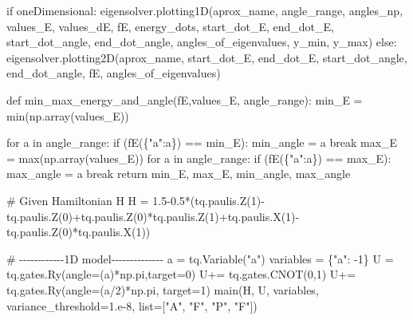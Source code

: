 \documentclass[
  letterpaper,
  DIV=11,
  numbers=noendperiod]{scrartcl}
\newenvironment{Shaded}{\begin{snugshade}}{\end{snugshade}}
\newcommand{\BuiltInTok}[1]{\textcolor[rgb]{0.00,0.23,0.31}{#1}}
\newcommand{\CommentTok}[1]{\textcolor[rgb]{0.37,0.37,0.37}{#1}}
\newcommand{\ControlFlowTok}[1]{\textcolor[rgb]{0.00,0.23,0.31}{#1}}
\newcommand{\DecValTok}[1]{\textcolor[rgb]{0.68,0.00,0.00}{#1}}
\newcommand{\FloatTok}[1]{\textcolor[rgb]{0.68,0.00,0.00}{#1}}
\newcommand{\KeywordTok}[1]{\textcolor[rgb]{0.00,0.23,0.31}{#1}}
\newcommand{\NormalTok}[1]{\textcolor[rgb]{0.00,0.23,0.31}{#1}}
\newcommand{\OperatorTok}[1]{\textcolor[rgb]{0.37,0.37,0.37}{#1}}
\newcommand{\StringTok}[1]{\textcolor[rgb]{0.13,0.47,0.30}{#1}}
\begin{document}
\begin{Shaded}
\begin{Highlighting}[]
        \ControlFlowTok{if}\NormalTok{ oneDimensional:}
\NormalTok{            eigensolver.plotting1D(aprox\_name, angle\_range, angles\_np, values\_E, values\_dE, fE, energy\_dots, start\_dot\_E, end\_dot\_E, start\_dot\_angle, end\_dot\_angle, angles\_of\_eigenvalues, y\_min, y\_max)}
        \ControlFlowTok{else}\NormalTok{:}
\NormalTok{            eigensolver.plotting2D(aprox\_name, start\_dot\_E, end\_dot\_E, start\_dot\_angle, end\_dot\_angle, fE, angles\_of\_eigenvalues)}
    

    \KeywordTok{def}\NormalTok{ min\_max\_energy\_and\_angle(fE,values\_E, angle\_range):}
\NormalTok{        min\_E }\OperatorTok{=} \BuiltInTok{min}\NormalTok{(np.array(values\_E))}

        \ControlFlowTok{for}\NormalTok{ a }\KeywordTok{in}\NormalTok{ angle\_range:}
            \ControlFlowTok{if}\NormalTok{ (fE(\{}\StringTok{"a"}\NormalTok{:a\}) }\OperatorTok{==}\NormalTok{ min\_E):}
\NormalTok{                min\_angle }\OperatorTok{=}\NormalTok{ a}
                \ControlFlowTok{break}
\NormalTok{        max\_E }\OperatorTok{=} \BuiltInTok{max}\NormalTok{(np.array(values\_E))}
        \ControlFlowTok{for}\NormalTok{ a }\KeywordTok{in}\NormalTok{ angle\_range:}
            \ControlFlowTok{if}\NormalTok{ (fE(\{}\StringTok{"a"}\NormalTok{:a\}) }\OperatorTok{==}\NormalTok{ max\_E):}
\NormalTok{                max\_angle }\OperatorTok{=}\NormalTok{ a}
                \ControlFlowTok{break}
        \ControlFlowTok{return}\NormalTok{ min\_E, max\_E, min\_angle, max\_angle}
    
\CommentTok{\# Given Hamiltonian H}
\NormalTok{H }\OperatorTok{=} \FloatTok{1.5}\OperatorTok{{-}}\FloatTok{0.5}\OperatorTok{*}\NormalTok{(tq.paulis.Z(}\DecValTok{1}\NormalTok{)}\OperatorTok{{-}}\NormalTok{tq.paulis.Z(}\DecValTok{0}\NormalTok{)}\OperatorTok{+}\NormalTok{tq.paulis.Z(}\DecValTok{0}\NormalTok{)}\OperatorTok{*}\NormalTok{tq.paulis.Z(}\DecValTok{1}\NormalTok{)}\OperatorTok{+}\NormalTok{tq.paulis.X(}\DecValTok{1}\NormalTok{)}\OperatorTok{{-}}\NormalTok{tq.paulis.Z(}\DecValTok{0}\NormalTok{)}\OperatorTok{*}\NormalTok{tq.paulis.X(}\DecValTok{1}\NormalTok{))}

\CommentTok{\# {-}{-}{-}{-}{-}{-}{-}{-}{-}{-}{-}{-}1D model{-}{-}{-}{-}{-}{-}{-}{-}{-}{-}{-}{-}{-}{-}}
\NormalTok{a }\OperatorTok{=}\NormalTok{ tq.Variable(}\StringTok{"a"}\NormalTok{)}
\NormalTok{variables }\OperatorTok{=}\NormalTok{ \{}\StringTok{"a"}\NormalTok{: }\OperatorTok{{-}}\DecValTok{1}\NormalTok{\}}
\NormalTok{U }\OperatorTok{=}\NormalTok{ tq.gates.Ry(angle}\OperatorTok{=}\NormalTok{(a)}\OperatorTok{*}\NormalTok{np.pi,target}\OperatorTok{=}\DecValTok{0}\NormalTok{)}
\NormalTok{U}\OperatorTok{+=}\NormalTok{ tq.gates.CNOT(}\DecValTok{0}\NormalTok{,}\DecValTok{1}\NormalTok{)}
\NormalTok{U}\OperatorTok{+=}\NormalTok{ tq.gates.Ry(angle}\OperatorTok{=}\NormalTok{(a}\OperatorTok{/}\DecValTok{2}\NormalTok{)}\OperatorTok{*}\NormalTok{np.pi, target}\OperatorTok{=}\DecValTok{1}\NormalTok{)}
\NormalTok{main(H, U, variables, variance\_threshold}\OperatorTok{=}\FloatTok{1.e{-}8}\NormalTok{, }\BuiltInTok{list}\OperatorTok{=}\NormalTok{[}\StringTok{"A"}\NormalTok{, }\StringTok{"F"}\NormalTok{, }\StringTok{"P"}\NormalTok{, }\StringTok{"F"}\NormalTok{])}


\end{Highlighting}
\end{Shaded}
\end{document}

